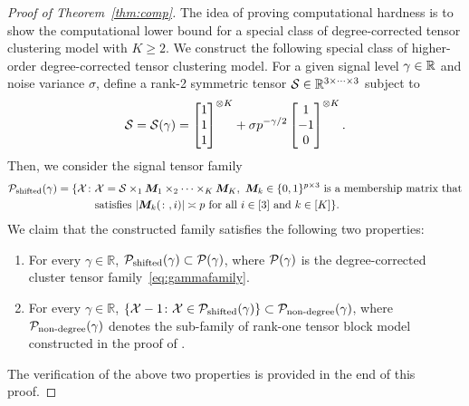 \documentclass[lettersize,onecolumn,journal]{IEEEtran}
\theoremstyle{definition}
\theoremstyle{definition}
\begin{document}
\begin{proof}[Proof of Theorem~\ref{thm:comp}]
The idea of proving computational hardness is to show the computational lower bound for a special class of degree-corrected tensor clustering model with $K\geq 2$. We construct the following special class of higher-order degree-corrected tensor clustering  model. For a given signal level $\gamma\in\mathbb{R}$ and noise variance $\sigma$, define a rank-2 symmetric tensor $\mathcal{S}\in\mathbb{R}^{3\times \cdots\times 3}$ subject to
\begin{equation}\label{eq:S}
\tS=\tS(\gamma) = \begin{bmatrix}
		1\\
		1\\
		1
		\end{bmatrix}^{\otimes K}
+\sigma p^{-\gamma/2} \begin{bmatrix}
		1\\
		-1\\
		0
	\end{bmatrix}^{\otimes K}.
\end{equation}
Then, we consider the signal tensor family
\begin{align}
\mathcal{P}_{\text{shifted}}(\gamma)=\{\mathcal{X}\colon & \mathcal{X}=\mathcal{S}\times_1\bm M_1\times_2 \cdots \times_K\bm M_K,\  \text{$\bm M_k\in\{0,1\}^{p\times 3}$ is a membership matrix that}
\\
& \text{satisfies $|\bm M_k(\colon,i)|\asymp p$ for all $i\in[3]$ and $k\in[K]$}\}.
\end{align}
We claim that the constructed family satisfies the following two properties:
\begin{enumerate}[wide,label=(\roman*)]
    \item For every $\gamma\in \mathbb{R}$, $\mathcal{P}_{\text{shifted}}(\gamma)\subset \mathcal{P}(\gamma)$, where $\mathcal{P}(\gamma)$ is the degree-corrected cluster tensor family~\eqref{eq:gammafamily}.
    \item For every $\gamma\in \mathbb{R}$, $\{\mathcal{X}-1\colon \mathcal{X}\in \mathcal{P}_{\text{shifted}}(\gamma)\}\subset \mathcal{P}_{\text{non-degree}}(\gamma)$, where $\mathcal{P}_{\text{non-degree}}(\gamma)$ denotes the sub-family of rank-one tensor block model constructed in the proof of \citet[Theorem 7]{han2020exact}. 
\end{enumerate}
The verification of the above two properties is provided in the end of this proof. 


\end{proof}
\end{document}
